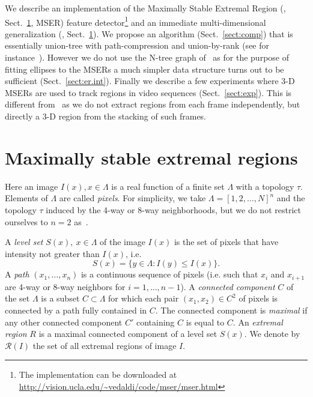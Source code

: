 \documentclass{article}
\begin{document}
We describe an implementation of the Maximally Stable Extremal Region (\cite{matas03robust}, Sect.~\ref{sect:def}, MSER) feature detector\footnote{The implementation can be downloaded at \url{http://vision.ucla.edu/~vedaldi/code/mser/mser.html}} and an immediate multi-dimensional generalization (\cite{donoser063d-segmentation}, Sect.~\ref{sect:def}). We propose an algorithm  (Sect.~\ref{sect:comp}) that is essentially union-tree with path-compression and union-by-rank (see for instance~\cite{murphy-chutorian06n-tree}). However we do not use the N-tree graph of~\cite{murphy-chutorian06n-tree} as for the purpose of fitting ellipses to the MSERs a much simpler data structure turns out to be sufficient (Sect.~\ref{sect:er.int}).  Finally we describe a few experiments where 3-D MSERs are used to track regions in video sequences (Sect.~\ref{sect:exp}). This is different from~\cite{donoser06efficient} as we do not extract regions from each frame independently, but directly a 3-D region from the stacking of such frames.

\section{Maximally stable extremal regions}\label{sect:def}


Here an image $I(x), x\in\Lambda$ is a real function of a finite set $\Lambda$ with a topology $\tau$. Elements of $\Lambda$ are called {\em pixels}. For simplicity, we take $\Lambda = [1,2,\dots,N]^n$ and the topology $\tau$ induced by the 4-way or 8-way neighborhoods, but we do not restrict ourselves to $n=2$ as~\cite{matas03robust}. 

A {\em level set} $S(x),\ x \in\Lambda$ of the image $I(x)$ is the set of pixels that have intensity not greater than $I(x)$, i.e.
\[
 S(x) = \{ y\in\Lambda : I(y) \leq I(x) \}.
\]
A {\em path} $(x_1,\dots,x_n)$ is a continuous sequence of pixels (i.e. such that $x_i$ and $x_{i+1}$ are 4-way or 8-way neighbors for $i=1,\dots,n-1$). A {\em connected component} $C$ of the set $\Lambda$ is a subset $C\subset\Lambda$ for which each pair $(x_1,x_2)\in C^2$ of pixels is connected by a path fully contained in $C$. The connected component is {\em maximal} if any other connected component $C'$ containing $C$ is equal to $C$. An {\em extremal region} $R$ is a maximal connected component of a level set $S(x)$. We denote by $\mathcal{R}(I)$ the set of all extremal regions of image $I$.
\end{document}
